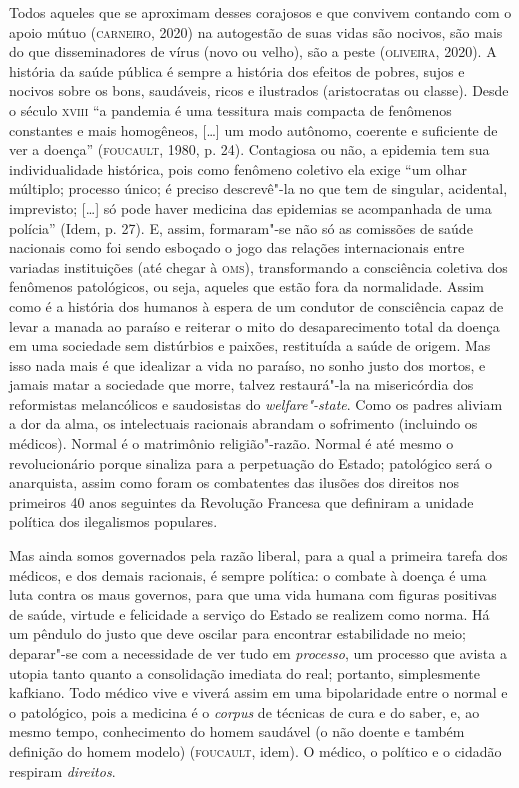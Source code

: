 Todos aqueles que se aproximam desses corajosos e que convivem contando
com o apoio mútuo (\textsc{carneiro}, 2020) na autogestão de suas vidas são
nocivos, são mais do que disseminadores de vírus (novo ou velho), são a
peste (\textsc{oliveira}, 2020). A história da saúde pública é sempre a história
dos efeitos de pobres, sujos e nocivos sobre os bons, saudáveis, ricos e
ilustrados (aristocratas ou classe). Desde o século \textsc{xviii} ``a pandemia é
uma tessitura mais compacta de fenômenos constantes e mais homogêneos,
{[}\ldots{}{]} um modo autônomo, coerente e suficiente de ver a doença''
(\textsc{foucault}, 1980, p. 24). Contagiosa ou não, a epidemia tem sua
individualidade histórica, pois como fenômeno coletivo ela exige ``um
olhar múltiplo; processo único; é preciso descrevê"-la no que tem de
singular, acidental, imprevisto; {[}\ldots{}{]} só pode haver medicina das
epidemias se acompanhada de uma polícia'' (Idem, p. 27). E, assim,
formaram"-se não só as comissões de saúde nacionais como foi sendo
esboçado o jogo das relações internacionais entre variadas instituições
(até chegar à \textsc{oms}), transformando a consciência coletiva dos fenômenos
patológicos, ou seja, aqueles que estão fora da normalidade. Assim como
é a história dos humanos à espera de um condutor de consciência capaz de
levar a manada ao paraíso e reiterar o mito do desaparecimento total da
doença em uma sociedade sem distúrbios e paixões, restituída a saúde de
origem. Mas isso nada mais é que idealizar a vida no paraíso, no sonho
justo dos mortos, e jamais matar a sociedade que morre, talvez
restaurá"-la na misericórdia dos reformistas melancólicos e saudosistas
do \emph{welfare"-state}. Como os padres aliviam a dor da alma, os
intelectuais racionais abrandam o sofrimento (incluindo os médicos).
Normal é o matrimônio religião"-razão. Normal é até mesmo o
revolucionário porque sinaliza para a perpetuação do Estado; patológico
será o anarquista, assim como foram os combatentes das ilusões dos
direitos nos primeiros 40 anos seguintes da Revolução Francesa que
definiram a unidade política dos ilegalismos populares.

Mas ainda somos governados pela razão liberal, para a qual a primeira
tarefa dos médicos, e dos demais racionais, é sempre política: o combate
à doença é uma luta contra os maus governos, para que uma vida humana
com figuras positivas de saúde, virtude e felicidade a serviço do Estado
se realizem como norma. Há um pêndulo do justo que deve oscilar para
encontrar estabilidade no meio; deparar"-se com a necessidade de ver tudo
em \emph{processo}, um processo que avista a utopia tanto quanto a
consolidação imediata do real; portanto, simplesmente kafkiano. Todo
médico vive e viverá assim em uma bipolaridade entre o normal e o
patológico, pois a medicina é o \emph{corpus} de técnicas de cura e do
saber, e, ao mesmo tempo, conhecimento do homem saudável (o não doente e
também definição do homem modelo) (\textsc{foucault}, idem). O médico, o político
e o cidadão respiram \emph{direitos}.

